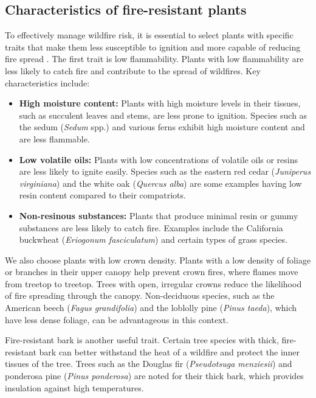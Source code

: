 \documentclass[
  12 pt,
]{Nemilov}
\begin{document}
\subsection{Characteristics of fire-resistant plants}\label{characteristics-of-fire-resistant-plants}

To effectively manage wildfire risk, it is essential to select plants with specific traits that make them less susceptible to ignition and more capable of reducing fire spread \citep{colorado2023fire, detweiler2006fire, moore2001fire}. The first trait is low flammability. Plants with low flammability are less likely to catch fire and contribute to the spread of wildfires. Key characteristics include:

\begin{itemize}
\item
  \textbf{High moisture content:} Plants with high moisture levels in their tissues, such as succulent leaves and stems, are less prone to ignition. Species such as the sedum (\emph{Sedum} spp.) and various ferns exhibit high moisture content and are less flammable.
\item
  \textbf{Low volatile oils:} Plants with low concentrations of volatile oils or resins are less likely to ignite easily. Species such as the eastern red cedar (\emph{Juniperus virginiana}) and the white oak (\emph{Quercus alba}) are some examples having low resin content compared to their compatriots.
\item
  \textbf{Non-resinous substances:} Plants that produce minimal resin or gummy substances are less likely to catch fire. Examples include the California buckwheat (\emph{Eriogonum fasciculatum}) and certain types of grass species.
\end{itemize}

We also choose plants with low crown density. Plants with a low density of foliage or branches in their upper canopy help prevent crown fires, where flames move from treetop to treetop. Trees with open, irregular crowns reduce the likelihood of fire spreading through the canopy. Non-deciduous species, such as the American beech (\emph{Fagus grandifolia}) and the loblolly pine (\emph{Pinus taeda}), which have less dense foliage, can be advantageous in this context.

Fire-resistant bark is another useful trait. Certain tree species with thick, fire-resistant bark can better withstand the heat of a wildfire and protect the inner tissues of the tree. Trees such as the Douglas fir (\emph{Pseudotsuga menziesii}) and ponderosa pine (\emph{Pinus ponderosa}) are noted for their thick bark, which provides insulation against high temperatures.
\end{document}
